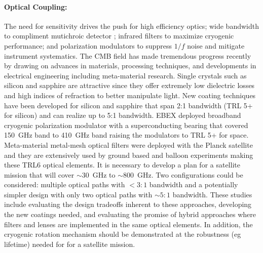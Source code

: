 \paragraph{Optical Coupling:} 
The need for sensitivity drives the push for high efficiency optics; wide bandwidth to compliment mutichroic detector ; infrared filters to maximize cryogenic performance; and polarization modulators to suppress $1/f$ noise and mitigate instrument systematics.  
The CMB field has made tremendous progress recently by drawing on advances in materials, processing techniques,  and developments in electrical engineering including meta-material research.  Single crystals such as silicon and sapphire are attractive since they offer extremely low dielectric losses and high indices of refraction to better manipulate light.  New coating techniques have been developed for silicon and sapphire that span 2:1 bandwidth (TRL 5+ for silicon) and can realize up to 5:1 bandwidth.  EBEX deployed broadband cryogenic polarization modulator with a superconducting bearing that covered 150~GHz band to 410~GHz band raising the modulators to TRL 5+ for space.  Meta-material metal-mesh optical filters were deployed with the Planck satellite and they are extensively used by ground based and balloon experiments making these TRL6 optical elements. It is necessary to develop a plan for a satellite mission that will cover $\sim30$~GHz to $\sim800$~GHz.  Two configurations could be considered: multiple optical paths with $<3:1$ bandwidth and a potentially simpler design with only two optical paths with  $\sim5:1$ bandwidth.   These studies include evaluating the design tradeoffs inherent to these approaches, developing the new coatings needed, and  evaluating the promise of hybrid approaches where filters and lenses are implemented in the same optical elements.  In addition, the cryogenic rotation mechanism should be demonstrated at the robustness (eg lifetime) needed for for a satellite mission.


